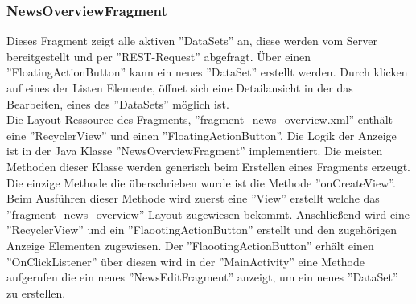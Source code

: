 \subsubsection{NewsOverviewFragment}
Dieses Fragment zeigt alle aktiven ''DataSets'' an, diese werden vom Server bereitgestellt und per ''REST-Request'' abgefragt. Über einen ''FloatingActionButton'' kann ein neues ''DataSet'' erstellt werden. Durch klicken auf eines der Listen Elemente, öffnet sich eine Detailansicht in der das Bearbeiten, eines des ''DataSets'' möglich ist.
\\
Die Layout Ressource des Fragments, ''fragment\_news\_overview.xml'' enthält eine ''RecyclerView'' und einen ''FloatingActionButton''. Die Logik der Anzeige ist in der Java Klasse ''NewsOverviewFragment'' implementiert. Die meisten Methoden dieser Klasse werden generisch beim Erstellen eines Fragments erzeugt. Die einzige Methode die überschrieben wurde ist die Methode ''onCreateView''. Beim Ausführen dieser Methode wird zuerst eine ''View'' erstellt welche das ''fragment\_news\_overview'' Layout zugewiesen bekommt. Anschließend wird eine ''RecyclerView'' und ein ''FlaootingActionButton'' erstellt und den zugehörigen Anzeige Elementen zugewiesen. Der ''FlaootingActionButton'' erhält einen ''OnClickListener'' über diesen wird in der ''MainActivity'' eine Methode aufgerufen die ein neues ''NewsEditFragment'' anzeigt, um ein neues ''DataSet'' zu erstellen. 
